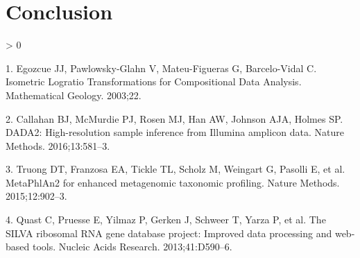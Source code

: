 \documentclass[
]{article}
\newlength{\cslhangindent}
\newenvironment{CSLReferences}[2] %
 {%
  \setlength{\parindent}{0pt}
  \ifodd #1 \everypar{\setlength{\hangindent}{\cslhangindent}}\ignorespaces\fi
  \ifnum #2 > 0
  \setlength{\parskip}{#2\baselineskip}
  \fi
 }%
 {}
\begin{document}
\hypertarget{conclusion}{%
\section*{Conclusion}\label{conclusion}}

\hypertarget{refs}{}
\begin{CSLReferences}{0}{0}
\leavevmode\hypertarget{ref-egozcue2003}{}%
1. Egozcue JJ, Pawlowsky-Glahn V, Mateu-Figueras G, Barcelo-Vidal C.
Isometric {Logratio Transformations} for {Compositional Data Analysis}.
Mathematical Geology. 2003;22.

\leavevmode\hypertarget{ref-callahan2016}{}%
2. Callahan BJ, McMurdie PJ, Rosen MJ, Han AW, Johnson AJA, Holmes SP.
{DADA2}: {High}-resolution sample inference from {Illumina} amplicon
data. Nature Methods. 2016;13:581--3.

\leavevmode\hypertarget{ref-truong2015}{}%
3. Truong DT, Franzosa EA, Tickle TL, Scholz M, Weingart G, Pasolli E,
et al. {MetaPhlAn2} for enhanced metagenomic taxonomic profiling. Nature
Methods. 2015;12:902--3.

\leavevmode\hypertarget{ref-quast2013}{}%
4. Quast C, Pruesse E, Yilmaz P, Gerken J, Schweer T, Yarza P, et al.
The {SILVA} ribosomal {RNA} gene database project: Improved data
processing and web-based tools. Nucleic Acids Research. 2013;41:D590--6.

\end{CSLReferences}
\end{document}
